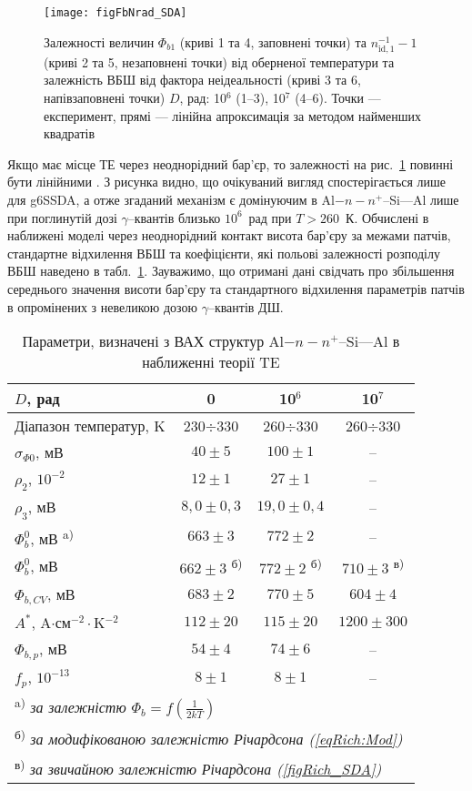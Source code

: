 \begin{figure}
\center
\texttt{[image: figFbNrad\_SDA]}
\caption{\label{figFbNrad_SDA}
Залежності величин $\Phi_{b1}$ (криві 1 та 4, заповнені точки) та
$n_{\mathrm{id},1}^{-1}-1$ (криві 2 та 5, незаповнені точки) від оберненої температури
та залежність ВБШ від фактора неідеальності (криві 3 та 6, напівзаповнені точки)
$D$, рад: 10$^6$ (1--3), 10$^7$ (4--6).
Точки --- експеримент,
прямі --- лінійна апроксимація за методом найменших квадратів
}%
\end{figure}

Якщо має місце ТЕ через неоднорідний бар'єр, то залежності на рис.~\ref{figFbNrad_SDA} повинні бути лінійними \cite{Werner,Tung:PhysRev,Schmitsdorf}.
З рисунка видно, що очікуваний вигляд спостерігається лише для g6SSDA,
а отже згаданий механізм є домінуючим в Al$-n-n^+$--Si---Al лише при поглинутій дозі $\gamma$--квантів близько $10^6$~рад при $T>260$~К.
Обчислені в наближені моделі через неоднорідний контакт висота бар'єру за межами патчів,
стандартне відхилення ВБШ та коефіцієнти, які польові залежності розподілу ВБШ наведено в табл.~\ref{tabSDAParRad}.
Зауважимо, що отримані дані свідчать про збільшення середнього значення висоти бар'єру та
стандартного відхилення параметрів патчів в опромінених з невеликою дозою $\gamma$--квантів ДШ.

\begin{table}
\caption{Параметри, визначені з ВАХ структур Al$-n-n^+$--Si---Al в наближенні теорії TE}
\label{tabSDAParRad}
\centering
\begin{tabular}{|l|c|c|c|}
\hline
$D$, рад & 0&10$^6$&10$^7$\\ \hline
Діапазон температур, K&230$\div$330&260$\div$330&260$\div$330\\ \hline
$\sigma_{\Phi0}$, мВ&$40\pm5$&$100\pm1$&--\\ \hline
$\rho_2$, $10^{-2}$&$12\pm1$&$27\pm1$&--\\ \hline
$\rho_3$, мВ&$8,0\pm0,3$&$19,0\pm0,4$&--\\ \hline
$\Phi_b^0$, мВ \textsuperscript{ a)}&$663\pm3$&$772\pm2$&--\\ \hline
$\Phi_b^0$, мВ &$662\pm3$ \textsuperscript{ б)}&$772\pm2$ \textsuperscript{ б)}&$710\pm3$ \textsuperscript{ в)}\\ \hline
$\Phi_{b,CV}$, мВ &$683\pm2$&$770\pm5$&$604\pm4$\\ \hline
$A^*$, A$\cdot$см$^{-2}\cdot$K$^{-2}$&$112\pm20$&$115\pm20$&$1200\pm300$\\
\hline
$\Phi_{b,p}$, мВ&$54\pm4$&$74\pm6$&--\\ \hline
$f_p$, $10^{-13}$&$8\pm1$&$8\pm1$&--\\ \hline
\multicolumn{4}{l}{\textsuperscript{ a)} \emph{за залежністю $\Phi_b=f(\frac{1}{2kT})$}} \\
\multicolumn{4}{l}{\textsuperscript{ б)} \emph{за модифікованою залежністю Річардсона (\ref{eqRich:Mod}) }} \\
\multicolumn{4}{l}{\textsuperscript{ в)} \emph{за звичайною залежністю Річардсона (\ref{figRich_SDA})}} \\
\end{tabular}
\end{table}


